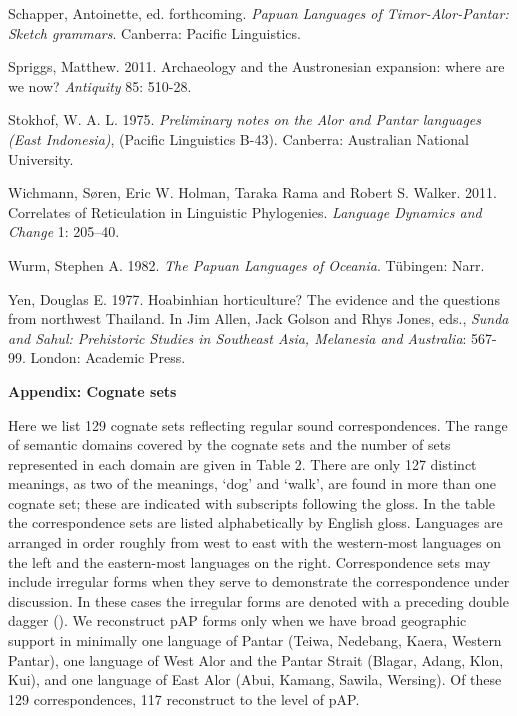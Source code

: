 Schapper, Antoinette, ed. forthcoming. \textit{Papuan Languages of Timor-Alor-Pantar: Sketch grammars}. Canberra: Pacific Linguistics.

Spriggs, Matthew. 2011. Archaeology and the Austronesian expansion: where are we now? \textit{Antiquity} 85: 510-28.

Stokhof, W. A. L. 1975. \textit{Preliminary notes on the Alor and Pantar languages (East Indonesia)}, (Pacific Linguistics B-43). Canberra: Australian National University.

Wichmann, S{\o}ren, Eric W. Holman, Taraka Rama and Robert S. Walker. 2011. Correlates of Reticulation in Linguistic Phylogenies. \textit{Language Dynamics and Change} 1: 205--40.

Wurm, Stephen A. 1982. \textit{The Papuan Languages of Oceania}. T\"ubingen: Narr.

Yen, Douglas E. 1977. Hoabinhian horticulture? The evidence and the questions from northwest Thailand. In Jim Allen, Jack Golson and Rhys Jones, eds., \textit{Sunda and Sahul: Prehistoric Studies in Southeast Asia, Melanesia and Australia}: 567-99. London: Academic Press.

{\bfseries
Appendix: Cognate sets }

 Here we list 129 cognate sets reflecting regular sound correspondences. The range of semantic domains covered by the cognate sets and the number of sets represented in each domain are given in Table 2. There are only 127 distinct meanings, as two of the meanings, {\textquoteleft}dog{\textquoteright} and {\textquoteleft}walk{\textquoteright}, are found in more than one cognate set; these are indicated with subscripts following the gloss. In the table the correspondence sets are listed alphabetically by English gloss. Languages are arranged in order roughly from west to east with the western-most languages on the left and the eastern-most languages on the right. Correspondence sets may include irregular forms when they serve to demonstrate the correspondence under discussion. In these cases the irregular forms are denoted with a preceding double dagger ({\ddag}). We reconstruct pAP forms only when we have broad geographic support in minimally one language of Pantar (Teiwa, Nedebang, Kaera, Western Pantar), 
one language of West Alor and the Pantar Strait (Blagar, Adang, Klon, Kui), and one language of East Alor (Abui, Kamang, Sawila, Wersing). Of these 129 correspondences, 117 reconstruct to the level of pAP.

